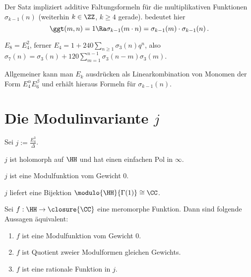 \begin{beme}
Der Satz impliziert additive Faltungsformeln für die multiplikativen Funktionen $\sigma_{k-1} (n)$ (weiterhin $k \in \ZZ$, $k \geq 4$ gerade).  bedeutet hier
\[
\ggt (m,n) = 1 \Ra \sigma_{k-1}(m \cdot n) = \sigma_{k-1}(m)\cdot \sigma_{k-1}(n)
\,.
\]
\end{beme}

\begin{bsp}
$E_8 = E_4^2$, ferner $E_4 = 1 + 240 \sum_{n \geq 1} \sigma_3(n) q^n$, also $\sigma_7 (n) = \sigma_3 (n) + 120 \sum_{m=1}^{n-1} \sigma_3 (n-m) \sigma_3 (m)$.

Allgemeiner kann man $E_k$ ausdrücken als Linearkombination von Monomen der Form $E_4^\alpha E_6^\beta$ und erhält hieraus Formeln für $\sigma_{k-1}(n)$.
\end{bsp}

\section{Die Modulinvariante $j$}

\begin{defi}
Sei $j := \frac{E_4^3}{\Delta}$.
\end{defi}

\begin{satz-list}
\item $j$ ist holomorph auf $\HH$ und hat einen einfachen Pol in $\infty$.
\item $j$ ist eine Modulfunktion vom Gewicht $0$.
\item $j$ liefert eine Bijektion $\modulo {\HH}{\Gamma(1)} \cong \CC$.
\end{satz-list}

\begin{satz}
Sei $f : \HH \to \closure{\CC}$ eine meromorphe Funktion. Dann sind folgende Aussagen äquivalent:
\begin{enumerate}
\item $f$ ist eine Modulfunktion vom Gewicht 0.
\item $f$ ist Quotient zweier Modulformen gleichen Gewichts.
\item $f$ ist eine rationale Funktion in $j$.
\end{enumerate}
\end{satz}

